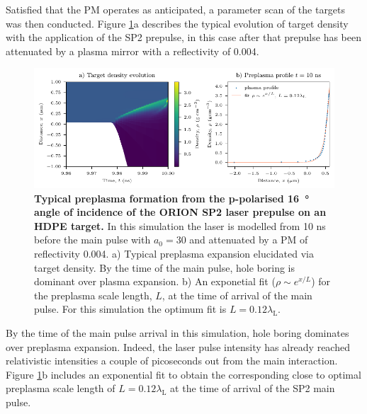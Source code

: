 Satisfied that the PM operates as anticipated, a parameter scan of the targets was then conducted. Figure \ref{fig:oriontargetpreplasma}a describes the typical evolution of target density with the application of the SP2 prepulse, in this case after that prepulse has been attenuated by a plasma mirror with a reflectivity of 0.004.
\begin{figure}
	\centering
	\includegraphics{figures/orion/orion_target_preplasma}
	\caption[Typical preplasma formation from the incidence of the ORION SP2 laser prepulse on a plastic target.]{\textbf{Typical preplasma formation from the p-polarised \qty{16}{\degree} angle of incidence of the ORION SP2 laser prepulse on an HDPE target.} In this simulation the laser is modelled from 10 ns before the main pulse with $a_0 = 30$ and attenuated by a PM of reflectivity 0.004. a) Typical preplasma expansion elucidated via target density. By the time of the main pulse, hole boring is dominant over plasma expansion. b) An exponetial fit ($\rho \sim e^{x/L}$) for the preplasma scale length, $L$, at the time of arrival of the main pulse. For this simulation the optimum fit is $L = 0.12 \lambda_\mathrm{L}$.}
	\label{fig:oriontargetpreplasma}
\end{figure}
By the time of the main pulse arrival in this simulation, hole boring dominates over preplasma expansion. Indeed, the laser pulse intensity has already reached relativistic intensities a couple of picoseconds out from the main interaction. Figure \ref{fig:oriontargetpreplasma}b includes an exponential fit to obtain the corresponding close to optimal preplasma scale length of $L = 0.12 \lambda_\mathrm{L}$ at the time of arrival of the SP2 main pulse.

